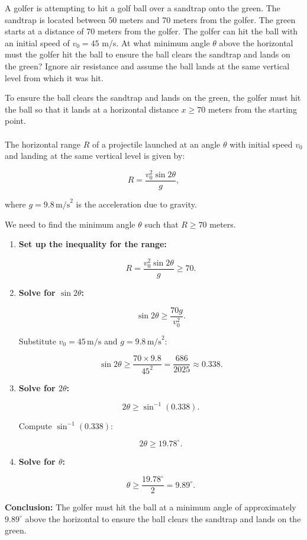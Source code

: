 \exampleline
\begin{example}
A golfer is attempting to hit a golf ball over a sandtrap onto the green. The sandtrap is located between 50 meters and 70 meters from the golfer. The green starts at a distance of 70 meters from the golfer. The golfer can hit the ball with an initial speed of \( v_0 = 45 \) m/s. At what minimum angle \( \theta \) above the horizontal must the golfer hit the ball to ensure the ball clears the sandtrap and lands on the green? Ignore air resistance and assume the ball lands at the same vertical level from which it was hit.

\begin{solution}
To ensure the ball clears the sandtrap and lands on the green, the golfer must hit the ball so that it lands at a horizontal distance \( x \geq 70 \) meters from the starting point. \\ \\ The horizontal range \( R \) of a projectile launched at an angle \( \theta \) with initial speed \( v_0 \) and landing at the same vertical level is given by:

\[
R = \dfrac{v_0^2 \sin 2\theta}{g},
\]

where \( g = 9.8 \, \text{m/s}^2 \) is the acceleration due to gravity.

We need to find the minimum angle \( \theta \) such that \( R \geq 70 \) meters.

\begin{enumerate}
    \item \textbf{Set up the inequality for the range:}

    \[
    R = \dfrac{v_0^2 \sin 2\theta}{g} \geq 70.
    \]

    \item \textbf{Solve for \( \sin 2\theta \):}

    \[
    \sin 2\theta \geq \dfrac{70g}{v_0^2}.
    \]

    Substitute \( v_0 = 45 \, \text{m/s} \) and \( g = 9.8 \, \text{m/s}^2 \):

    \[
    \sin 2\theta \geq \dfrac{70 \times 9.8}{45^2} = \dfrac{686}{2025} \approx 0.338.
    \]

    \item \textbf{Solve for \( 2\theta \):}

    \[
    2\theta \geq \sin^{-1}(0.338).
    \]

    Compute \( \sin^{-1}(0.338) \):

    \[
    2\theta \geq 19.78^\circ.
    \]

    \item \textbf{Solve for \( \theta \):}

    \[
    \theta \geq \dfrac{19.78^\circ}{2} = 9.89^\circ.
    \]

\end{enumerate}

\noindent \textbf{Conclusion:} The golfer must hit the ball at a minimum angle of approximately \( 9.89^\circ \) above the horizontal to ensure the ball clears the sandtrap and lands on the green.

\end{solution}
\end{example}
